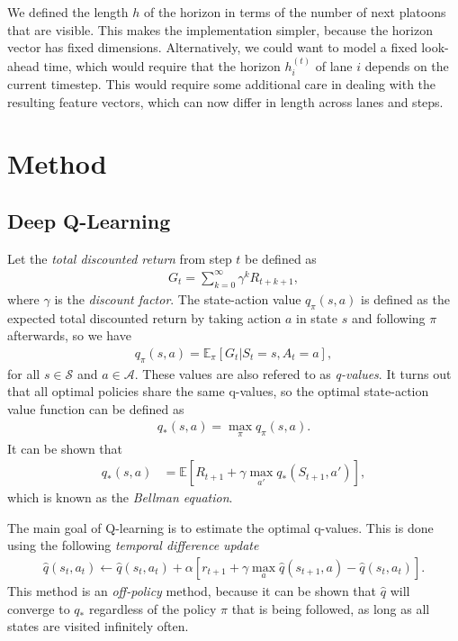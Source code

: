\documentclass{article}
\theoremstyle{definition}
\theoremstyle{plain}
\begin{document}
We defined the length $h$ of the horizon in terms of the number of next platoons
that are visible. This makes the implementation simpler, because the horizon
vector has fixed dimensions. Alternatively, we could want to model a fixed
look-ahead time, which would require that the horizon $h_{i}^{(t)}$ of lane $i$
depends on the current timestep. This would require some additional care in
dealing with the resulting feature vectors, which can now differ in length
across lanes and steps.


\section{Method}

\subsection{Deep Q-Learning}

Let the \textit{total discounted return} from step $t$ be defined as
\begin{align}
  G_{t} = \sum_{k=0}^{\infty} \gamma^{k} R_{t+k+1} ,
\end{align}
where $\gamma$ is the \textit{discount factor}. The state-action value
$q_{\pi}(s, a)$ is defined as the expected total discounted return by taking
action $a$ in state $s$ and following $\pi$ afterwards, so we have
\begin{align}
  q_\pi(s,a) = \mathbb{E}_{\pi}[ G_{t} | S_{t} = s, A_{t} = a ] ,
\end{align}
for all $s \in \mathcal{S}$ and $a \in \mathcal{A}$. These values are also
refered to as \textit{q-values}. It turns out that all optimal policies share
the same q-values, so the optimal state-action value function can be defined as
\begin{align}
  q_{*}(s, a) = \max_{\pi} q_{\pi}(s, a) .
\end{align}
It can be shown that
\begin{align}
  q_{*}(s, a) &= \mathbb{E} \left[ R_{t+1} + \gamma \max_{a'} q_{*}(S_{t+1}, a') \right] ,
\end{align}
which is known as the \textit{Bellman equation}.

The main goal of Q-learning is to estimate the optimal q-values. This is done using the following \textit{temporal difference update}
\begin{align}
  \hat{q}(s_{t}, a_{t}) \leftarrow \hat{q}(s_{t}, a_{t}) + \alpha [ r_{t+1} + \gamma \max_{a} \hat{q}(s_{t+1}, a) - \hat{q}(s_{t}, a_{t}) ] .
\end{align}
This method is an \textit{off-policy} method, because it can be shown that
$\hat{q}$ will converge to $q_{*}$ regardless of the policy $\pi$ that is being
followed, as long as all states are visited infinitely often.
\end{document}
